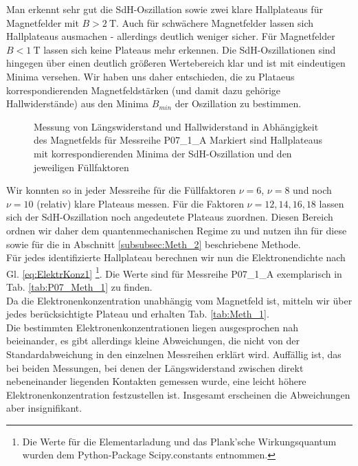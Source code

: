 Man erkennt sehr gut die SdH-Oszillation sowie zwei klare Hallplateaus für Magnetfelder mit $B>\SI{2}{\tesla}$. Auch für schwächere Magnetfelder lassen sich Hallplateaus ausmachen - allerdings deutlich weniger sicher. Für Magnetfelder $B<\SI{1}{\tesla}$ lassen sich keine Plateaus mehr erkennen. Die SdH-Oszillationen sind hingegen über einen deutlich größeren Wertebereich klar und ist mit eindeutigen Minima versehen. Wir haben uns daher entschieden, die zu Plataeus korrespondierenden Magnetfeldstärken (und damit dazu gehörige Hallwiderstände) aus den Minima $B_{min}$ der Oszillation zu bestimmen.

\begin{figure}[h!]
	\centering
	
    \caption{Messung von Längswiderstand und Hallwiderstand in Abhängigkeit des Magnetfelds für Messreihe P07\_1\_A Markiert sind Hallplateaus mit korrespondierenden Minima der SdH-Oszillation und den jeweiligen Füllfaktoren}
	\label{abb:P07_Meth_1}
\end{figure}

Wir konnten so in jeder Messreihe für die Füllfaktoren $\nu = 6$, $\nu = 8$ und noch $\nu = 10 $ (relativ) klare Plateaus messen. Für die Faktoren $\nu = 12, 14, 16, 18$ lassen sich der SdH-Oszillation noch angedeutete Plateaus zuordnen. Diesen Bereich ordnen wir daher dem quantenmechanischen Regime zu und nutzen ihn für diese sowie für die in Abschnitt \ref{subsubsec:Meth_2} beschriebene Methode. \\
Für jedes identifizierte Hallplateau berechnen wir nun die Elektronendichte nach Gl. \ref{eq:ElektrKonz1} \footnote{Die Werte für die Elementarladung und das Plank'sche Wirkungsquantum wurden dem Python-Package Scipy.constants entnommen.}. Die Werte sind für Messreihe P07\_1\_A exemplarisch in Tab. \ref{tab:P07_Meth_1} zu finden. \\

Da die Elektronenkonzentration unabhängig vom Magnetfeld ist, mitteln wir über jedes berücksichtigte Plateau und erhalten Tab. \ref{tab:Meth_1}. \\ 

Die bestimmten Elektronenkonzentrationen liegen ausgesprochen nah beieinander, es gibt allerdings kleine Abweichungen, die nicht von der Standardabweichung in den einzelnen Messreihen erklärt wird. Auffällig ist, das bei beiden Messungen, bei denen der Längswiderstand zwischen direkt nebeneinander liegenden Kontakten gemessen wurde, eine leicht höhere Elektronenkonzentration festzustellen ist. Insgesamt erscheinen die Abweichungen aber insignifikant. \\

